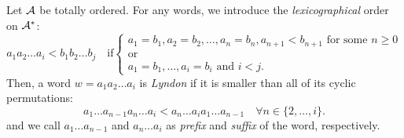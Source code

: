 \begin{definition}
\label{app:def_LyndonWords}
    Let $\mathcal{A}$ be totally ordered.
    For any words, we introduce the \emph{lexicographical} order on $\mathcal{A}^*$:
    \begin{equation}
    a_1a_2\ldots a_i < b_1b_2\ldots b_j \quad \text{if} \begin{cases}
            a_1 = b_1, a_2 = b_2, \ldots, a_n = b_n, a_{n+1} < b_{n+1}\text{ for some } n \ge 0 \\
            \text{or} \\
            a_1 = b_1, \ldots, a_i = b_i \text{ and } i < j.
        \end{cases}
    \end{equation}
    Then, a word $w = a_1a_2\ldots a_i$ is \emph{Lyndon} if it is smaller than all of its cyclic permutations:
    \begin{equation*}
        a_1\ldots a_{n-1}a_n \ldots a_i < a_n\ldots a_i a_1\ldots a_{n-1}
        \quad
        \forall n \in \{2, \ldots, i\}.
    \end{equation*}
    and we call $a_1\ldots a_{n-1}$ and $a_n \ldots a_i$ as \emph{prefix} and \emph{suffix} of the word, respectively.
\end{definition}
